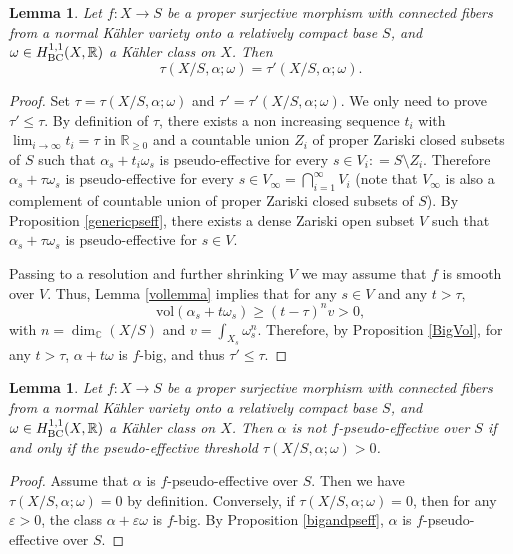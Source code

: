 \documentclass[12pt]{amsart}
\numberwithin{equation}{section}
\newtheorem{lemma}  [theorem]     {Lemma}
\theoremstyle{definition}
\theoremstyle{plain}
\newtheorem*{thm A*}{Theorem A}
\newtheorem*{thm B*}{Theorem B}
\newtheorem*{thm C*}{Theorem C}
\newtheorem*{thm D*}{Theorem D}
\theoremstyle{definition}
\renewcommand{\1}{\mathds{1}}
\newcommand{\vol}{\mathrm{vol}}
\renewcommand{\>}{\rightarrow}
\newcommand{\R}{\mathbb R}
\begin{document}
\begin{lemma}
Let $f:X\to S$ be a proper surjective morphism with connected fibers from a normal K\"ahler variety onto a relatively compact base $S$, and $\omega\in H^{1,1}_{\rm{BC}}(X, \R)$ a K\"ahler class on $X$. Then  $$\tau(X/S, \alpha; \omega)=\tau'(X/S, \alpha; \omega).$$
\end{lemma}
\begin{proof} Set $\tau=\tau(X/S, \alpha; \omega)$ and $\tau'= \tau'(X/S, \alpha; \omega)$. We only need to prove $\tau' \le \tau$. By definition of $\tau$, there exists a non increasing sequence $t_i$ with $\lim_{i \to \infty} t_i =  \tau$ in $\mathbb{R}_{\ge 0}$ and a countable union $Z_i$ of proper Zariski closed subsets of $S$ such that $\alpha_s + t_i \omega_s$ is pseudo-effective for every $s\in V_i : = S \setminus Z_i$. Therefore $\alpha_s + \tau \omega_s$ is pseudo-effective for every $s \in V_\infty = \bigcap_{i =1}^\infty V_i$ (note that $V_\infty$ is also a complement of countable union of proper Zariski closed subsets of $S$). By Proposition \ref{genericpseff}, there exists a dense Zariski open subset $V$ such that $\alpha_s + \tau \omega_s$ is pseudo-effective for $s\in V$. 

Passing to a resolution and further shrinking $V$ we may assume that $f$ is smooth over $V$. Thus, Lemma \ref{vollemma} implies that for any $s\in V$ and any $t> \tau$, $$\vol(\alpha_s + t\omega_s) \ge (t-\tau)^n v>0,$$ with $n = \dim_{\mathbb{C}} (X/S)$ and $v =\int _{X_s} \omega_s^n$. Therefore, by Proposition \ref{BigVol}, for any $t> \tau$, $\alpha + t\omega$ is $f$-big, and thus $\tau' \le  \tau$.
\end{proof}

\begin{lemma}\label{nonpseffcriterion}
Let $f:X\to S$ be a proper surjective morphism with connected fibers from a normal K\"ahler variety onto a relatively compact base $S$, and $\omega \in H^{1,1}_{\rm{BC}}(X,\mathbb{R})$ a K\"ahler class on $X$. Then $\alpha$ is not $f$-pseudo-effective over $S$ if and only if the pseudo-effective threshold $\tau(X/S,\alpha ; \omega)> 0$.
\end{lemma}
\begin{proof}
Assume that $\alpha$ is $f$-pseudo-effective over $S$. Then we have $\tau(X/S, \alpha; \omega) = 0$ by definition. 
Conversely, if $\tau(X/S, \alpha; \omega) = 0$, then for any $\varepsilon > 0$, the class $\alpha + \varepsilon \omega$ is $f$-big. By Proposition \ref{bigandpseff}, $\alpha$ is $f$-pseudo-effective over $S$. 
\end{proof}
\end{document}
